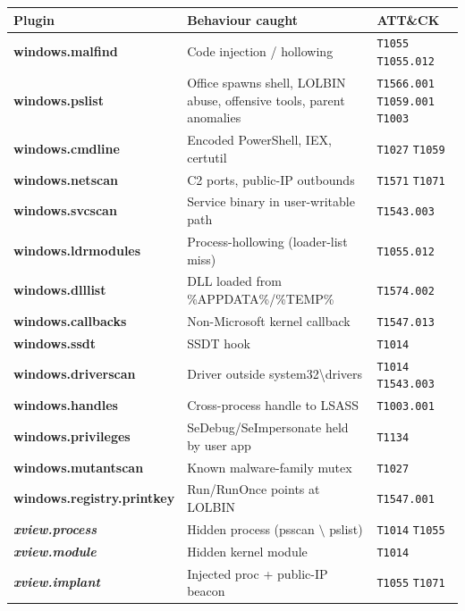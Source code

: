 \documentclass[11pt,a4paper]{article}
\newcommand{\mitre}[1]{\colorbox{accent!25}{\textcolor{ink}{\texttt{\footnotesize #1}}}}
\begin{document}
\begin{center}
\renewcommand{\arraystretch}{1.15}
\begin{tabular}{>{\bfseries}p{3.4cm} p{4.6cm} p{6.0cm}}
\toprule
\textbf{Plugin} & \textbf{Behaviour caught} & \textbf{ATT\&CK} \\
\midrule
windows.malfind        & Code injection / hollowing             & \mitre{T1055} \mitre{T1055.012} \\
windows.pslist         & Office spawns shell, LOLBIN abuse,
                         offensive tools, parent anomalies      & \mitre{T1566.001} \mitre{T1059.001} \mitre{T1003} \\
windows.cmdline        & Encoded PowerShell, IEX, certutil      & \mitre{T1027} \mitre{T1059} \\
windows.netscan        & C2 ports, public-IP outbounds          & \mitre{T1571} \mitre{T1071} \\
windows.svcscan        & Service binary in user-writable path   & \mitre{T1543.003} \\
windows.ldrmodules     & Process-hollowing (loader-list miss)   & \mitre{T1055.012} \\
windows.dlllist        & DLL loaded from \%APPDATA\%/\%TEMP\%   & \mitre{T1574.002} \\
windows.callbacks      & Non-Microsoft kernel callback          & \mitre{T1547.013} \\
windows.ssdt           & SSDT hook                              & \mitre{T1014} \\
windows.driverscan     & Driver outside system32\textbackslash drivers & \mitre{T1014} \mitre{T1543.003} \\
windows.handles        & Cross-process handle to LSASS          & \mitre{T1003.001} \\
windows.privileges     & SeDebug/SeImpersonate held by user app & \mitre{T1134} \\
windows.mutantscan     & Known malware-family mutex             & \mitre{T1027} \\
windows.registry.printkey & Run/RunOnce points at LOLBIN        & \mitre{T1547.001} \\
\textit{xview.process} & Hidden process (psscan $\setminus$ pslist) & \mitre{T1014} \mitre{T1055} \\
\textit{xview.module}  & Hidden kernel module                   & \mitre{T1014} \\
\textit{xview.implant} & Injected proc + public-IP beacon       & \mitre{T1055} \mitre{T1071} \\
\bottomrule
\end{tabular}
\end{center}
\end{document}
